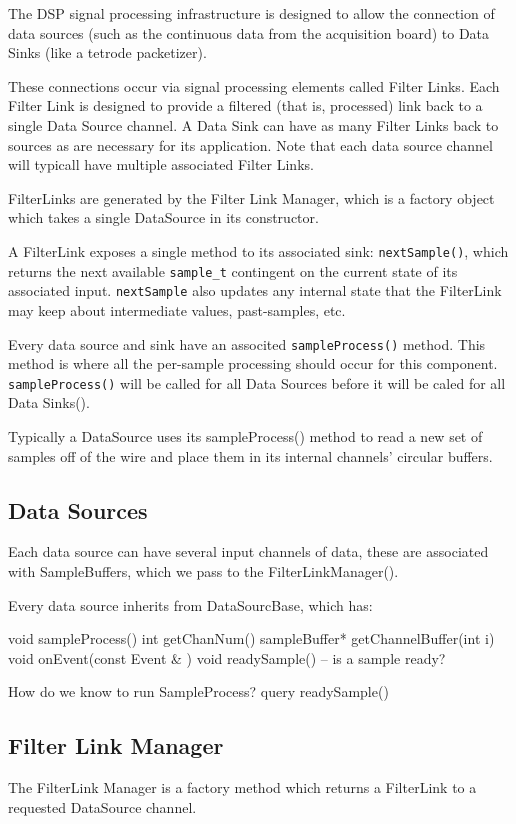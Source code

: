 The DSP signal processing infrastructure is designed to allow the
connection of data sources (such as the continuous data from the
acquisition board) to Data Sinks (like a tetrode packetizer).

These connections occur via signal processing elements called Filter
Links. Each Filter Link is designed to provide a filtered (that is,
processed) link back to a single Data Source channel.  A Data Sink can
have as many Filter Links back to sources as are necessary for its
application. Note that each data source channel will typicall have
multiple associated Filter Links.

FilterLinks are generated by the Filter Link Manager, which is a
factory object which takes a single DataSource in its
constructor.

A FilterLink exposes a single method to its associated sink:
\texttt{nextSample()}, which returns the next available
\texttt{sample\_t} contingent on the current state of its associated
input.  \texttt{nextSample} also updates any internal state that the
FilterLink may keep about intermediate values, past-samples, etc.

Every data source and sink have an associted \texttt{sampleProcess()}
method.  This method is where all the per-sample processing should
occur for this component. \texttt{sampleProcess()} will be called for
all Data Sources before it will be caled for all Data Sinks().

Typically a DataSource uses its sampleProcess() method to read a new
set of samples off of the wire and place them in its internal
channels' circular buffers.

\subsection{Data Sources}
Each data source can have several input channels of data, these are
associated with SampleBuffers, which we pass to the
FilterLinkManager().

Every data source inherits from DataSourcBase, which has:

void sampleProcess()
int getChanNum()
sampleBuffer* getChannelBuffer(int i)
void onEvent(const Event & )
void readySample() -- is a sample ready? 


How do we know to run SampleProcess? query readySample()


\subsection{Filter Link Manager}
The FilterLink Manager is a factory method which returns a FilterLink to a requested DataSource channel. 

